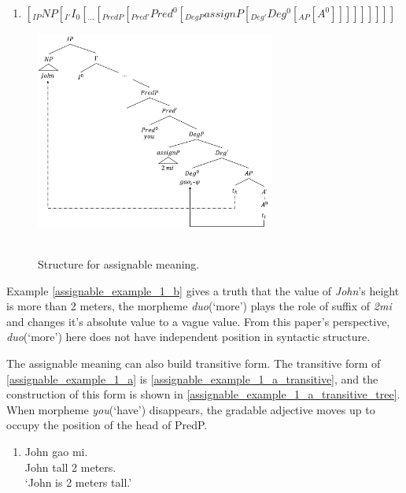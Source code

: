 \documentclass{ctexart}
\begin{document}
\begin{enumerate}
    \item \label{assignable_structure}
    $[_{IP} NP [_{I'} I_0[_{...}[_{PredP}[_{Pred'}Pred^0[_{DegP}assignP[_{Deg'}Deg^0[_{AP}[A^0]]]]]]]]]$
\end{enumerate}

\begin{figure}[H]
    \centering
    \includegraphics[width=0.7\textwidth]{Pic/assignment_meaning.png}
    \begin{caption}
        \\ \vspace{-1.1ex}
        Structure for assignable meaning.
    \end{caption}
\end{figure}

Example \ref{assignable_example_1_b} gives a truth that the value of \textit{John}'s height is more than 2 meters, the morpheme \textit{duo}(`more') plays the role of suffix of \textit{2mi} and changes it's absolute value to a vague value. From this paper's perspective, \textit{duo}(`more') here does not have independent position in syntactic structure.

The assignable meaning can also build transitive form. The transitive form of \ref{assignable_example_1_a} is \ref{assignable_example_1_a_transitive}, and the construction of this form is shown in \ref{assignable_example_1_a_transitive_tree}. When morpheme \textit{you}(`have') disappears, the gradable adjective moves up to occupy the position of the head of PredP.

\begin{enumerate}
    \item \label{assignable_example_1_a_transitive}
    John gao  mi. \\
    John tall 2 meters. \\
    `John is 2 meters tall.'
\end{enumerate}
\end{document}
